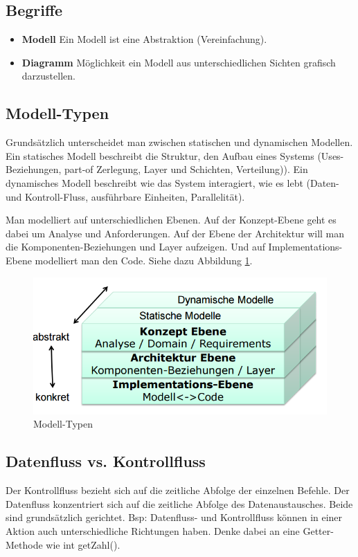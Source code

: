 \subsection{Begriffe}
\begin{itemize}
	\item \textbf{Modell} Ein Modell ist eine Abstraktion (Vereinfachung).
	\item \textbf{Diagramm} Möglichkeit ein Modell aus unterschiedlichen Sichten grafisch darzustellen.
\end{itemize}

\subsection{Modell-Typen}
Grundsätzlich unterscheidet man zwischen statischen und dynamischen Modellen. Ein statisches Modell beschreibt die Struktur, den Aufbau eines Systems (Uses-Beziehungen, part-of Zerlegung, Layer und Schichten, Verteilung)). Ein dynamisches Modell beschreibt wie das System interagiert, wie es lebt  (Daten- und Kontroll-Fluss, ausführbare Einheiten, Parallelität).

Man modelliert auf unterschiedlichen Ebenen. Auf der Konzept-Ebene geht es dabei um Analyse und Anforderungen. Auf der Ebene der Architektur will man die Komponenten-Beziehungen und Layer aufzeigen. Und auf Implementations-Ebene modelliert man den Code. Siehe dazu Abbildung \ref{fig:modelltypen}.

\begin{figure}[h!]
\centering
\includegraphics[width=0.7\linewidth]{fig/modelltypen}
\caption{Modell-Typen}
\label{fig:modelltypen}
\end{figure}

\subsection{Datenfluss vs. Kontrollfluss}
Der Kontrollfluss bezieht sich auf die zeitliche Abfolge der einzelnen Befehle. Der Datenfluss konzentriert sich auf die zeitliche Abfolge des Datenaustausches. Beide sind grundsätzlich gerichtet. Bsp: Datenfluss- und Kontrollfluss können in einer Aktion auch unterschiedliche Richtungen haben. Denke dabei an eine Getter-Methode wie int getZahl().

